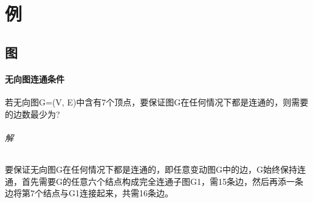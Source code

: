 
\chapter{例}

\section{图}

\subsubsection{无向图连通条件}
若无向图G=(V, E)中含有7个顶点，要保证图G在任何情况下都是连通的，则需要的边数最少为?

\subparagraph{解}
要保证无向图G在任何情况下都是连通的，即任意变动图G中的边，G始终保持连通，首先需要G的任意六个结点构成完全连通子图G1，需15条边，然后再添一条边将第7个结点与G1连接起来，共需16条边。 

